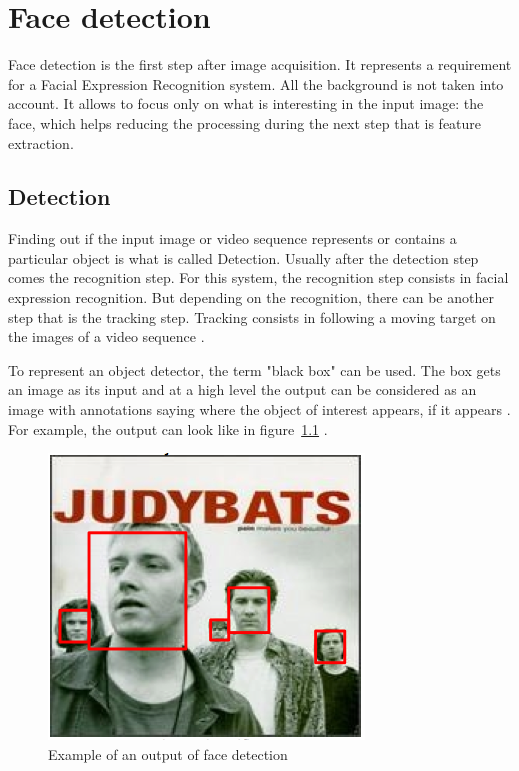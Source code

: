 \chapter{Face detection}

\noindent Face detection is the first step after image acquisition. It represents a requirement for a Facial Expression Recognition system. All the background is not taken into account. It allows to focus only on what is interesting in the input image: the face, which helps reducing the processing during the next step that is feature extraction.
\newline

\section{Detection}

\vspace{\baselineskip}
\noindent Finding out if the input image or video sequence represents or contains a particular object is what is called Detection. Usually after the detection step comes the recognition step. For this system, the recognition step consists in facial expression recognition. But depending on the recognition, there can be another step that is the tracking step. Tracking consists in following a moving target on the images of a video sequence \cite{DIN08}.
\newline

\noindent To represent an object detector, the term "black box" can be used. The box gets an image as its input and at a high level the output can be considered as an image with annotations saying where the object of interest appears, if it appears \cite{DIN08}. For example, the output can look like in figure~\ref{output_example_face_detection} \cite{DIN08}.
\newline

\begin{figure}[!h]
\begin{center}
\noindent \includegraphics[scale=0.7]{figures/output_example_face_detection} 
\newline
\caption{Example of an output of face detection}
\label{output_example_face_detection}
\end{center} 
\end{figure}

